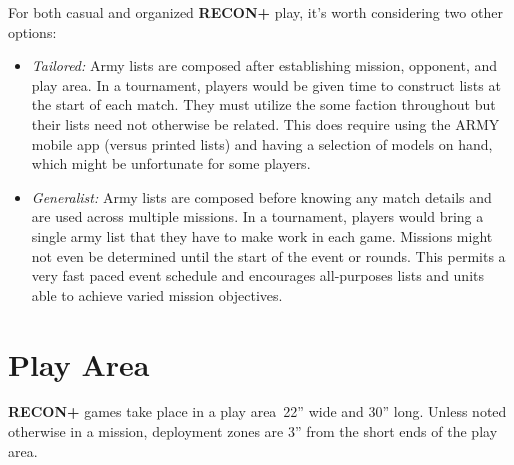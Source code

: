 \documentclass[14pt,dvipsnames]{extarticle}
\newcommand{\reconplus}{\textbf{RECON+}\xspace}
\begin{document}
For both casual and organized \reconplus play, it's worth considering two other options:
\begin{itemize}
  \item \emph{Tailored:} Army lists are composed after establishing
    mission, opponent, and play area. In a tournament, players would
    be given time to construct lists at the start of each match. They
    must utilize the some faction throughout but their lists need not
    otherwise be related. This does require using the ARMY mobile app
    (versus printed lists) and having a selection of models on hand,
    which might be unfortunate for some players.

  \item \emph{Generalist:} Army lists are composed before knowing any
    match details and are used across multiple missions. In a
    tournament, players would bring a single army list that they have
    to make work in each game.  Missions might not even be determined
    until the start of the event or rounds.  This permits a very fast
    paced event schedule and encourages all-purposes lists and units
    able to achieve varied mission objectives.

\end{itemize}

%
%
%
%


\clearpage
{}
\section{Play Area}

\reconplus games take place in a play area~22'' wide and 30'' long.
Unless noted otherwise in a mission, deployment zones are 3'' from the
short ends of the play area.
\end{document}
